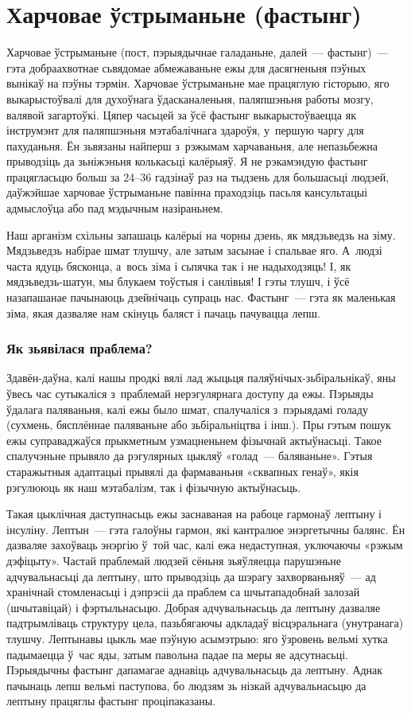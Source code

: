 \chapter{Харчовае ўстрыманьне (фастынг)}

Харчовае ўстрыманьне (пост, пэрыядычнае галаданьне, далей~--- фастынг)~--- гэта добраахвотнае сьвядомае абмежаваньне ежы для дасягненьня пэўных вынікаў на пэўны тэрмін. Харчовае ўстрыманьне мае працяглую гісторыю, яго выкарыстоўвалі для духоўнага ўдасканаленьня, паляпшэньня работы мозгу, валявой загартоўкі. Цяпер часьцей за ўсё фастынг выкарыстоўваецца як інструмэнт для паляпшэньня мэтабалічнага здароўя, у~першую чаргу для пахуданьня. Ён зьвязаны найперш з~рэжымам харчаваньня, але непазьбежна прыводзіць да зьніжэньня колькасьці калёрыяў. Я не рэкамэндую фастынг працягласьцю больш за 24--36 гадзінаў раз на тыдзень для большасьці людзей, даўжэйшае харчовае ўстрыманьне павінна праходзіць пасьля кансультацыі адмыслоўца або пад мэдычным назіраньнем.

Наш арганізм схільны запашаць калёрыі на чорны дзень, як мядзьведзь на зіму. Мядзьведзь набірае шмат тлушчу, але затым засынае і спальвае яго. А~людзі часта ядуць бясконца, а~вось зіма і сьпячка так і не надыходзяць! І, як мядзьведзь-шатун, мы блукаем тоўстыя і санлівыя! І гэты тлушч, і ўсё назапашанае пачынаюць дзейнічаць супраць нас. Фастынг~--- гэта як маленькая зіма, якая дазваляе нам скінуць баляст і пачаць пачувацца лепш.

\subsection{Як зьявілася праблема?}

Здавён-даўна, калі нашы продкі вялі лад жыцьця паляўнічых-зьбіральнікаў, яны ўвесь час сутыкаліся з~праблемай нерэгулярнага доступу да ежы. Пэрыяды ўдалага паляваньня, калі ежы было шмат, спалучаліся з~пэрыядамі голаду (сухмень, бясплённае паляваньне або зьбіральніцтва і інш.). Пры гэтым пошук ежы суправаджаўся прыкметным узмацненьнем фізычнай актыўнасьці. Такое спалучэньне прывяло да рэгулярных цыкляў «голад~--- баляваньне». Гэтыя старажытныя адаптацыі прывялі да фармаваньня «сквапных генаў», якія рэгулююць як наш мэтабалізм, так і фізычную актыўнасьць.

Такая цыклічная даступнасьць ежы заснаваная на рабоце гармонаў лептыну і інсуліну. Лептын~--- гэта галоўны гармон, які кантралюе энэргетычны балянс. Ён дазваляе захоўваць энэргію ў~той час, калі ежа недаступная, уключаючы «рэжым дэфіцыту». Частай праблемай людзей сёньня зьяўляецца парушэньне адчувальнасьці да лептыну, што прыводзіць да шэрагу захворваньняў~--- ад хранічнай стомленасьці і дэпрэсіі да праблем са шчытападобнай залозай (шчытавіцай) і фэртыльнасьцю. Добрая адчувальнасьць да лептыну дазваляе падтрымліваць структуру цела, пазьбягаючы адкладаў вісцэральнага (унутранага) тлушчу. Лептынавы цыкль мае пэўную асымэтрыю: яго ўзровень вельмі хутка падымаецца ў~час яды, затым павольна падае па меры яе адсутнасьці. Пэрыядычны фастынг дапамагае аднавіць адчувальнасьць да лептыну. Аднак пачынаць лепш вельмі паступова, бо людзям зь нізкай адчувальнасьцю да лептыну працяглы фастынг проціпаказаны.

